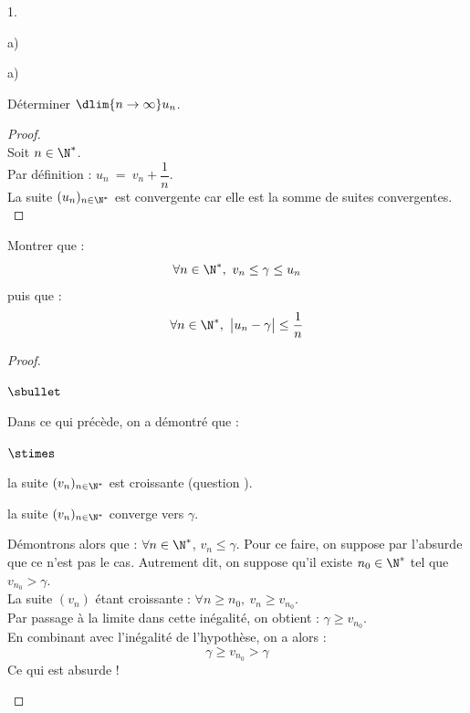 \documentclass[11pt]{article}%
\begin{document}
\begin{noliste}{1.}
\begin{noliste}{a)}
  \end{noliste}

\item 
  \begin{noliste}{a)} 
    \setlength{\itemsep}{2mm}
  \item Déterminer $ \dlim{n \to \infty} u_{n}$.

    \begin{proof}~\\%
      Soit $n \in \N^*$.\\
      Par définition : $u_n \ = \ v_n + \dfrac{1}{n}$.\\
      La suite $(u_n)_{n \in \N^*}$ est convergente car elle est la
      somme de suites convergentes.%
      ~\\[-1.3cm]
    \end{proof}

  \item Montrer que :
    \[
    \forall n \in \N^*, \ v_{n} \leq \gamma \leq u_{n}
    \]
    puis que :
    \[
    \forall n \in \N^*, \ \big|u_{n} - \gamma\big| \leq \dfrac{1}{n}
    \]

    \begin{proof}~%
      \begin{noliste}{$\sbullet$}
      \item Dans ce qui précède, on a démontré que : 
        \begin{noliste}{$\stimes$}
        \item la suite $(v_n)_{n \in \N^*}$ est croissante (question
          ).
        \item la suite $(v_n)_{n \in \N^*}$ converge vers $\gamma$.
        \end{noliste}
        Démontrons alors que : $\forall n \in \N^*$, $v_n \leq
        \gamma$. Pour ce faire, on suppose par l'absurde que ce n'est
        pas le cas. Autrement dit, on suppose qu'il existe $n_0 \in
        \N^*$ tel que $v_{n_0} > \gamma$.\\[.2cm]
        La suite $(v_n)$ étant croissante : $\forall n \geq n_0, \ v_n
        \geq v_{n_0}$.\\
        Par passage à la limite dans cette inégalité, on obtient :
        $\gamma \geq v_{n_0}$.\\
        En combinant avec l'inégalité de l'hypothèse, on a alors :
        \[
        \gamma \geq v_{n_0} > \gamma
        \]
        Ce qui est absurde ! %


\end{noliste}
\end{proof}
\end{noliste}
\end{noliste}
\end{document}
